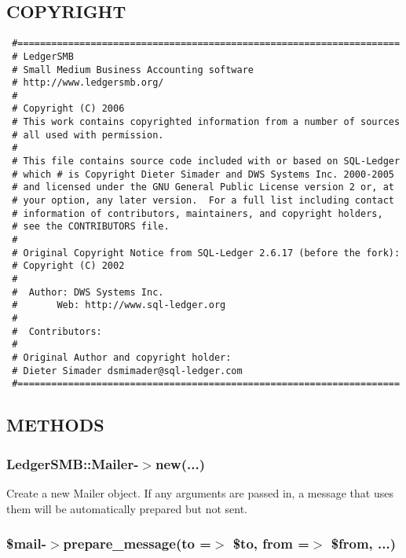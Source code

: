 \begin{description}
\begin{description}
\begin{description}
\begin{description}
\begin{description}
\subsection*{COPYRIGHT\label{LedgerSMB::Mailer_Mail_output_for_LedgerSMB_COPYRIGHT}}
\begin{verbatim}
 #====================================================================
 # LedgerSMB
 # Small Medium Business Accounting software
 # http://www.ledgersmb.org/
 #
 # Copyright (C) 2006
 # This work contains copyrighted information from a number of sources
 # all used with permission.
 #
 # This file contains source code included with or based on SQL-Ledger
 # which # is Copyright Dieter Simader and DWS Systems Inc. 2000-2005
 # and licensed under the GNU General Public License version 2 or, at
 # your option, any later version.  For a full list including contact
 # information of contributors, maintainers, and copyright holders,
 # see the CONTRIBUTORS file.
 #
 # Original Copyright Notice from SQL-Ledger 2.6.17 (before the fork):
 # Copyright (C) 2002
 #
 #  Author: DWS Systems Inc.
 #       Web: http://www.sql-ledger.org
 #
 #  Contributors:
 #
 # Original Author and copyright holder:
 # Dieter Simader dsmimader@sql-ledger.com
 #====================================================================
\end{verbatim}
\subsection*{METHODS\label{LedgerSMB::Mailer_Mail_output_for_LedgerSMB_METHODS}}
\subsubsection*{LedgerSMB::Mailer-$>$new(...)\label{LedgerSMB::Mailer_Mail_output_for_LedgerSMB_LedgerSMB::Mailer-_new_}}


Create a new Mailer object.  If any arguments are passed in, a message
that uses them will be automatically prepared but not sent.

\subsubsection*{\$mail-$>$prepare\_message(to =$>$ \$to, from =$>$ \$from, ...)\label{LedgerSMB::Mailer_Mail_output_for_LedgerSMB__mail-_prepare_message_to_to_from_from_}}



\end{description}
\end{description}
\end{description}
\end{description}
\end{description}
